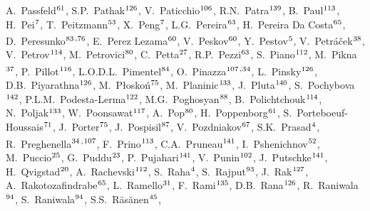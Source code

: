 \begin{flushleft}
A.~Passfeld$^\textrm{\scriptsize 61}$,
S.P.~Pathak$^\textrm{\scriptsize 126}$,
V.~Paticchio$^\textrm{\scriptsize 106}$,
R.N.~Patra$^\textrm{\scriptsize 139}$,
B.~Paul$^\textrm{\scriptsize 113}$,
H.~Pei$^\textrm{\scriptsize 7}$,
T.~Peitzmann$^\textrm{\scriptsize 53}$,
X.~Peng$^\textrm{\scriptsize 7}$,
L.G.~Pereira$^\textrm{\scriptsize 63}$,
H.~Pereira Da Costa$^\textrm{\scriptsize 65}$,
D.~Peresunko$^\textrm{\scriptsize 83}$\textsuperscript{,}$^\textrm{\scriptsize 76}$,
E.~Perez Lezama$^\textrm{\scriptsize 60}$,
V.~Peskov$^\textrm{\scriptsize 60}$,
Y.~Pestov$^\textrm{\scriptsize 5}$,
V.~Petr\'{a}\v{c}ek$^\textrm{\scriptsize 38}$,
V.~Petrov$^\textrm{\scriptsize 114}$,
M.~Petrovici$^\textrm{\scriptsize 80}$,
C.~Petta$^\textrm{\scriptsize 27}$,
R.P.~Pezzi$^\textrm{\scriptsize 63}$,
S.~Piano$^\textrm{\scriptsize 112}$,
M.~Pikna$^\textrm{\scriptsize 37}$,
P.~Pillot$^\textrm{\scriptsize 116}$,
L.O.D.L.~Pimentel$^\textrm{\scriptsize 84}$,
O.~Pinazza$^\textrm{\scriptsize 107}$\textsuperscript{,}$^\textrm{\scriptsize 34}$,
L.~Pinsky$^\textrm{\scriptsize 126}$,
D.B.~Piyarathna$^\textrm{\scriptsize 126}$,
M.~P\l osko\'{n}$^\textrm{\scriptsize 75}$,
M.~Planinic$^\textrm{\scriptsize 133}$,
J.~Pluta$^\textrm{\scriptsize 140}$,
S.~Pochybova$^\textrm{\scriptsize 142}$,
P.L.M.~Podesta-Lerma$^\textrm{\scriptsize 122}$,
M.G.~Poghosyan$^\textrm{\scriptsize 88}$,
B.~Polichtchouk$^\textrm{\scriptsize 114}$,
N.~Poljak$^\textrm{\scriptsize 133}$,
W.~Poonsawat$^\textrm{\scriptsize 117}$,
A.~Pop$^\textrm{\scriptsize 80}$,
H.~Poppenborg$^\textrm{\scriptsize 61}$,
S.~Porteboeuf-Houssais$^\textrm{\scriptsize 71}$,
J.~Porter$^\textrm{\scriptsize 75}$,
J.~Pospisil$^\textrm{\scriptsize 87}$,
V.~Pozdniakov$^\textrm{\scriptsize 67}$,
S.K.~Prasad$^\textrm{\scriptsize 4}$,
R.~Preghenella$^\textrm{\scriptsize 34}$\textsuperscript{,}$^\textrm{\scriptsize 107}$,
F.~Prino$^\textrm{\scriptsize 113}$,
C.A.~Pruneau$^\textrm{\scriptsize 141}$,
I.~Pshenichnov$^\textrm{\scriptsize 52}$,
M.~Puccio$^\textrm{\scriptsize 25}$,
G.~Puddu$^\textrm{\scriptsize 23}$,
P.~Pujahari$^\textrm{\scriptsize 141}$,
V.~Punin$^\textrm{\scriptsize 102}$,
J.~Putschke$^\textrm{\scriptsize 141}$,
H.~Qvigstad$^\textrm{\scriptsize 20}$,
A.~Rachevski$^\textrm{\scriptsize 112}$,
S.~Raha$^\textrm{\scriptsize 4}$,
S.~Rajput$^\textrm{\scriptsize 93}$,
J.~Rak$^\textrm{\scriptsize 127}$,
A.~Rakotozafindrabe$^\textrm{\scriptsize 65}$,
L.~Ramello$^\textrm{\scriptsize 31}$,
F.~Rami$^\textrm{\scriptsize 135}$,
D.B.~Rana$^\textrm{\scriptsize 126}$,
R.~Raniwala$^\textrm{\scriptsize 94}$,
S.~Raniwala$^\textrm{\scriptsize 94}$,
S.S.~R\"{a}s\"{a}nen$^\textrm{\scriptsize 45}$,

\end{flushleft}
